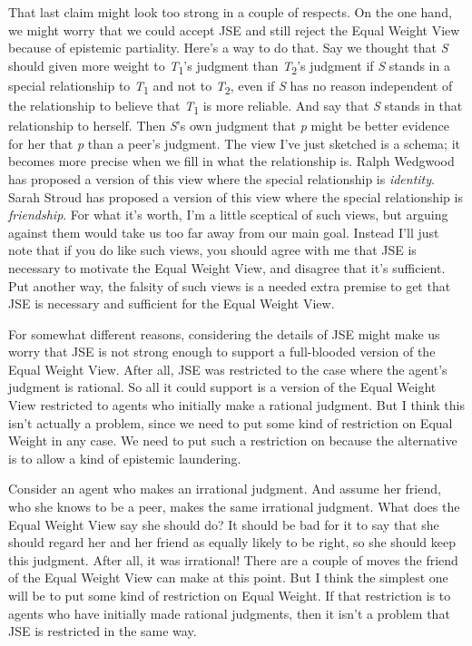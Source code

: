 \documentclass[
  11pt,
  letterpaper,
  DIV=11,
  numbers=noendperiod,
  twoside]{scrartcl}
\begin{document}
That last claim might look too strong in a couple of respects. On the
one hand, we might worry that we could accept JSE and still reject the
Equal Weight View because of epistemic partiality. Here's a way to do
that. Say we thought that \emph{S} should given more weight to
\emph{T}\textsubscript{1}'s judgment than \emph{T}\textsubscript{2}'s
judgment if \emph{S} stands in a special relationship to
\emph{T}\textsubscript{1} and not to \emph{T}\textsubscript{2}, even if
\emph{S} has no reason independent of the relationship to believe that
\emph{T}\textsubscript{1} is more reliable. And say that \emph{S} stands
in that relationship to herself. Then \emph{S}'s own judgment that
\emph{p} might be better evidence for her that \emph{p} than a peer's
judgment. The view I've just sketched is a schema; it becomes more
precise when we fill in what the relationship is. Ralph Wedgwood has
proposed a version of this view where the special relationship is
\emph{identity}. Sarah Stroud has proposed a version of this view where
the special relationship is \emph{friendship}. For what it's worth, I'm
a little sceptical of such views, but arguing against them would take us
too far away from our main goal. Instead I'll just note that if you do
like such views, you should agree with me that JSE is necessary to
motivate the Equal Weight View, and disagree that it's sufficient. Put
another way, the falsity of such views is a needed extra premise to get
that JSE is necessary and sufficient for the Equal Weight View.

For somewhat different reasons, considering the details of JSE might
make us worry that JSE is not strong enough to support a full-blooded
version of the Equal Weight View. After all, JSE was restricted to the
case where the agent's judgment is rational. So all it could support is
a version of the Equal Weight View restricted to agents who initially
make a rational judgment. But I think this isn't actually a problem,
since we need to put some kind of restriction on Equal Weight in any
case. We need to put such a restriction on because the alternative is to
allow a kind of epistemic laundering.

Consider an agent who makes an irrational judgment. And assume her
friend, who she knows to be a peer, makes the same irrational judgment.
What does the Equal Weight View say she should do? It should be bad for
it to say that she should regard her and her friend as equally likely to
be right, so she should keep this judgment. After all, it was
irrational! There are a couple of moves the friend of the Equal Weight
View can make at this point. But I think the simplest one will be to put
some kind of restriction on Equal Weight. If that restriction is to
agents who have initially made rational judgments, then it isn't a
problem that JSE is restricted in the same way.
\end{document}
